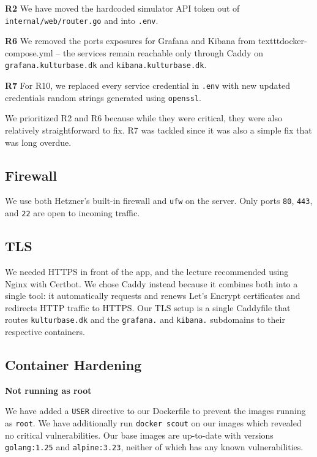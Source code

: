 \textbf{R2}
We have moved the hardcoded simulator API token out of \texttt{internal/web/router.go} and into \texttt{.env}.

\textbf{R6}
We removed the ports exposures for Grafana and Kibana from texttt{docker-compose.yml} -- the services remain reachable only through Caddy on \texttt{grafana.kulturbase.dk} and \texttt{kibana.kulturbase.dk}.

\textbf{R7}
For R10, we replaced every service credential in \texttt{.env} with new updated credentials random strings generated using \texttt{openssl}.

We prioritized R2 and R6 because while they were critical, they were also relatively straightforward to fix. R7 was tackled since it was also a simple fix that was long overdue.

\subsection{Firewall}

We use both Hetzner's built-in firewall and \texttt{ufw} on the server. Only ports \texttt{80}, \texttt{443}, and \texttt{22} are open to incoming traffic.

\subsection{TLS}

We needed HTTPS in front of the app, and the lecture recommended using Nginx with Certbot. We chose Caddy instead because it combines both into a single tool: it automatically requests and renews Let's Encrypt certificates and redirects HTTP traffic to HTTPS. Our TLS setup is a single Caddyfile that routes \texttt{kulturbase.dk} and the \texttt{grafana.} and \texttt{kibana.} subdomains to their respective containers.

\subsection{Container Hardening}

\textbf{Not running as root}

We have added a \texttt{USER} directive to our Dockerfile to prevent the images running as \texttt{root}. We have additionally run \texttt{docker scout} on our images which revealed no critical vulnerabilities. Our base images are up-to-date with versions \texttt{golang:1.25} and \texttt{alpine:3.23}, neither of which has any known vulnerabilities.

